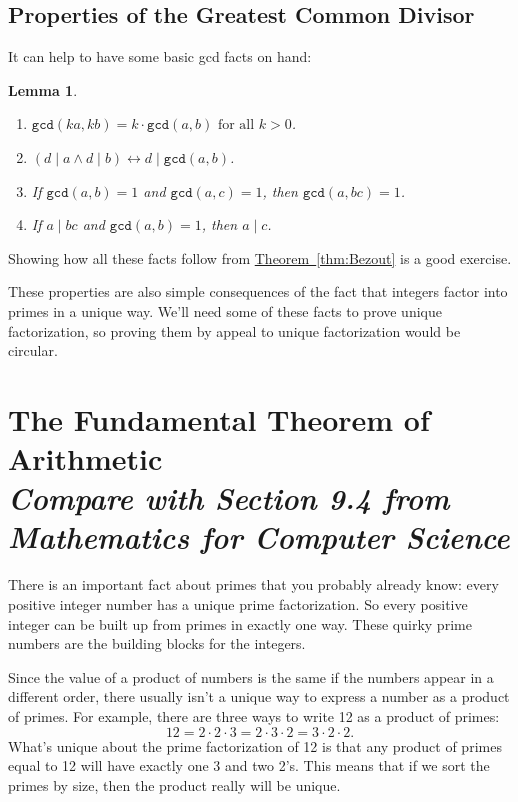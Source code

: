 \documentclass[11pt,oneside]{book}
\newtheorem{lem}[thm]{Lemma}
\theoremstyle{definition}
\begin{document}
\subsection{Properties of the Greatest Common Divisor}
It can help to have some basic gcd facts on hand:
\begin{lem}\
\begin{enumerate}[label=\alph*)]
    \item $\texttt{gcd}(ka, kb) = k \cdot \texttt{gcd}(a, b) \text{ for all } k > 0$.

    \item $(d \mid a \land d \mid b) \leftrightarrow d \mid \texttt{gcd}(a, b)$.

    \item If $\texttt{gcd}(a, b) = 1$ and $\texttt{gcd}(a, c) = 1$, then $\texttt{gcd}(a, bc) = 1$.

    \item If $a \mid bc$ and $\texttt{gcd}(a, b) = 1$, then $a \mid c$.
\end{enumerate}
\end{lem}

Showing how all these facts follow from \hyperref[thm:Bezout]{Theorem~\ref*{thm:Bezout}} is a good exercise.

These properties are also simple consequences of the fact that integers factor into primes in a unique way.
We'll need some of these facts to prove unique factorization, so proving them by appeal to unique factorization would be circular.


\section[The Fundamental Theorem of Arithmetic]{The Fundamental Theorem of Arithmetic\\[0.5ex]
\normalsize\normalfont\textit{
    Compare with Section 9.4 from \emph{Mathematics for Computer Science}
}}
There is an important fact about primes that you probably already know: every positive integer number has a unique prime factorization.
So every positive integer can be built up from primes in exactly one way.
These quirky prime numbers are the building blocks for the integers.

Since the value of a product of numbers is the same if the numbers appear in a different order, there usually isn't a unique way to express a number as a product of primes.
For example, there are three ways to write 12 as a product of primes:
\[ 12 = 2 \cdot 2 \cdot 3 = 2 \cdot 3 \cdot 2 = 3 \cdot 2 \cdot 2. \]
What's unique about the prime factorization of 12 is that any product of primes equal to 12 will have exactly one 3 and two 2's.
This means that if we sort the primes by size, then the product really will be unique.
\end{document}
